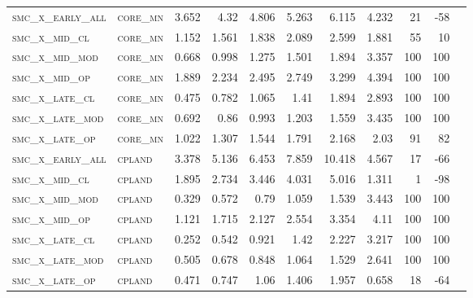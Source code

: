 \begin{landscape}
\begin{center}
\begin{footnotesize}
\begin{longtable}{llrrrrrr|rrr}
\textsc{smc\_x\_early\_all} & \textsc{core\_mn  }   & 3.652      & 4.32       & 4.806      & 5.263      & 6.115      & 4.232      & 21    & -58    \\
\textsc{smc\_x\_mid\_cl   } & \textsc{core\_mn  }   & 1.152      & 1.561      & 1.838      & 2.089      & 2.599      & 1.881      & 55    & 10     \\
\textsc{smc\_x\_mid\_mod  } & \textsc{core\_mn  }   & 0.668      & 0.998      & 1.275      & 1.501      & 1.894      & 3.357      & 100   & 100    \\
\textsc{smc\_x\_mid\_op   } & \textsc{core\_mn  }   & 1.889      & 2.234      & 2.495      & 2.749      & 3.299      & 4.394      & 100   & 100    \\
\textsc{smc\_x\_late\_cl  } & \textsc{core\_mn  }   & 0.475      & 0.782      & 1.065      & 1.41       & 1.894      & 2.893      & 100   & 100    \\
\textsc{smc\_x\_late\_mod } & \textsc{core\_mn  }   & 0.692      & 0.86       & 0.993      & 1.203      & 1.559      & 3.435      & 100   & 100    \\
\textsc{smc\_x\_late\_op  } & \textsc{core\_mn  }   & 1.022      & 1.307      & 1.544      & 1.791      & 2.168      & 2.03       & 91    & 82     \\
\textsc{smc\_x\_early\_all} & \textsc{cpland    }   & 3.378      & 5.136      & 6.453      & 7.859      & 10.418     & 4.567      & 17    & -66    \\
\textsc{smc\_x\_mid\_cl   } & \textsc{cpland    }   & 1.895      & 2.734      & 3.446      & 4.031      & 5.016      & 1.311      & 1     & -98    \\
\textsc{smc\_x\_mid\_mod  } & \textsc{cpland    }   & 0.329      & 0.572      & 0.79       & 1.059      & 1.539      & 3.443      & 100   & 100    \\
\textsc{smc\_x\_mid\_op   } & \textsc{cpland    }   & 1.121      & 1.715      & 2.127      & 2.554      & 3.354      & 4.11       & 100   & 100    \\
\textsc{smc\_x\_late\_cl  } & \textsc{cpland    }   & 0.252      & 0.542      & 0.921      & 1.42       & 2.227      & 3.217      & 100   & 100    \\
\textsc{smc\_x\_late\_mod } & \textsc{cpland    }   & 0.505      & 0.678      & 0.848      & 1.064      & 1.529      & 2.641      & 100   & 100    \\
\textsc{smc\_x\_late\_op  } & \textsc{cpland    }   & 0.471      & 0.747      & 1.06       & 1.406      & 1.957      & 0.658      & 18    & -64    \\

\end{longtable}
\end{footnotesize}
\end{center}
\end{landscape}
